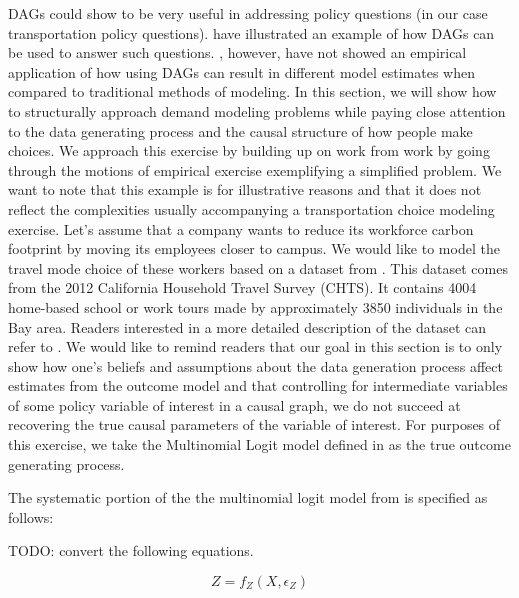 DAGs could show to be very useful in addressing policy questions (in our case transportation policy questions).
\citet{brathwaite_2018_causal} have illustrated an example of how DAGs can be used to answer such questions.
\citet{brathwaite_2018_causal}, however, have not showed an empirical application of how using DAGs can result in
different model estimates when compared to traditional methods of modeling.
In this section, we will show how to structurally approach demand modeling problems while paying close
attention to the data generating process and the causal structure of how people make choices.
We approach this exercise by building up on work from \citet{brathwaite_2018_causal} work by going through
the motions of empirical exercise exemplifying a simplified problem.
We want to note that this example is for illustrative reasons and that it does not reflect the complexities
usually accompanying a transportation choice modeling exercise.
Let's assume that a company wants to reduce its workforce carbon footprint by moving its employees closer to campus.
We would like to model the travel mode choice of these workers based on a dataset from \citet{brathwaite-asymmetric}.
This dataset comes from the 2012 California Household Travel Survey (CHTS).
It contains 4004 home-based school or work tours made by approximately 3850 individuals in the Bay area.
Readers interested in a more detailed description of the dataset can refer to \citet{brathwaite-asymmetric}.
We would like to remind readers that our goal in this section is to only show how one's beliefs and assumptions about the data generation
process affect estimates from the outcome model and that controlling for intermediate variables of
some policy variable of interest in a causal graph,
we do not succeed at recovering the true causal parameters of the variable of interest.
For purposes of this exercise, we take the Multinomial Logit model defined in \citet{brathwaite-asymmetric} as the true outcome generating process.

The systematic portion of the the multinomial logit model from \citet{brathwaite-asymmetric} is specified as follows:

TODO: convert the following equations.

\[Z = f_Z(X, \epsilon_Z)  \]

